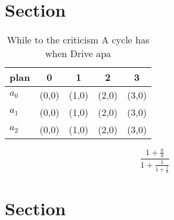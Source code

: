\documentclass[a4paper]{article}
\begin{document}
\section{Section}

\begin{table}
\begin{adjustbox}{width=0.6\columnwidth}
\begin{tabular}{|l|l|l|l|l|}
\hline
\textbf{plan} & \multicolumn{1}{c|}{\textbf{0}} & \multicolumn{1}{c|}{\textbf{1}} & \multicolumn{1}{c|}{\textbf{2}} & \multicolumn{1}{c|}{\textbf{3}} \\ \hline
\textbf{$a_0$}  & (0,0) & (1,0) & (2,0) & (3,0) \\ \hline
\textbf{$a_1$}  & (0,0) & (1,0) & (2,0) & (3,0) \\ \hline
\textbf{$a_2$}  & (0,0) & (1,0) & (2,0) & (3,0) \\ \hline
\end{tabular}
\end{adjustbox}
\caption{While to the criticism A cycle has when Drive apa
}
\end{table}

\[ \frac{1+\frac{a}{b}}{1+\frac{1}{1+\frac{1}{a}}} \]

\section{Section}
\end{document}
